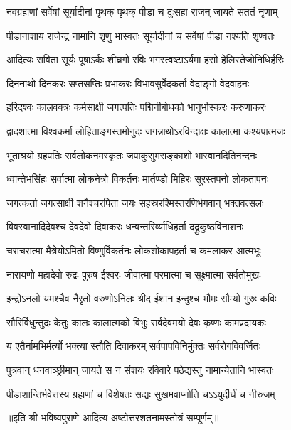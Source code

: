 

\twolineshloka
{नवग्रहाणां सर्वेषां सूर्यादीनां पृथक् पृथक्}
{पीडा च दुःसहा राजन् जायते सततं नृणाम्}

\twolineshloka
{पीडानाशाय राजेन्द्र नामानि शृणु भास्वतः}
{सूर्यादीनां च सर्वेषां पीडा नश्यति शृण्वतः}

\twolineshloka
{आदित्यः सविता सूर्यः पूषाऽर्कः शीघ्रगो रविः}
{भगस्त्वष्टाऽर्यमा हंसो हेलिस्तेजोनिधिर्हरिः}

\twolineshloka
{दिननाथो दिनकरः सप्तसप्तिः प्रभाकरः}
{विभावसुर्वेदकर्ता वेदाङ्गो वेदवाहनः}

\twolineshloka
{हरिदश्वः कालवक्त्रः कर्मसाक्षी जगत्पतिः}
{पद्मिनीबोधको भानुर्भास्करः करुणाकरः}

\twolineshloka
{द्वादशात्मा विश्वकर्मा लोहिताङ्गस्तमोनुदः}
{जगन्नाथोऽरविन्दाक्षः कालात्मा कश्यपात्मजः}

\twolineshloka
{भूताश्रयो ग्रहपतिः सर्वलोकनमस्कृतः}
{जपाकुसुमसङ्काशो भास्वानदितिनन्दनः}

\twolineshloka
{ध्वान्तेभसिंहः सर्वात्मा लोकनेत्रो विकर्तनः}
{मार्तण्डो मिहिरः सूरस्तपनो लोकतापनः}

\twolineshloka
{जगत्कर्ता जगत्साक्षी शनैश्चरपिता जयः}
{सहस्ररश्मिस्तरणिर्भगवान् भक्तवत्सलः}

\twolineshloka
{विवस्वानादिदेवश्च देवदेवो दिवाकरः}
{धन्वन्तरिर्व्याधिहर्ता दद्रुकुष्ठविनाशनः}

\twolineshloka
{चराचरात्मा मैत्रेयोऽमितो विष्णुर्विकर्तनः}
{लोकशोकापहर्ता च कमलाकर आत्मभूः}

\twolineshloka
{नारायणो महादेवो रुद्रः पुरुष ईश्वरः}
{जीवात्मा परमात्मा च सूक्ष्मात्मा सर्वतोमुखः}

\twolineshloka
{इन्द्रोऽनलो यमश्चैव नैरृतो वरुणोऽनिलः}
{श्रीद ईशान इन्दुश्च भौमः सौम्यो गुरुः कविः}

\twolineshloka
{सौरिर्विधुन्तुदः केतुः कालः कालात्मको विभुः}
{सर्वदेवमयो देवः कृष्णः कामप्रदायकः}

\twolineshloka
{य एतैर्नामभिर्मर्त्यो भक्त्या स्तौति दिवाकरम्}
{सर्वपापविनिर्मुक्तः सर्वरोगविवर्जितः}

\twolineshloka
{पुत्रवान् धनवाञ्छ्रीमान् जायते स न संशयः}
{रविवारे पठेद्यस्तु नामान्येतानि भास्वतः}

\twolineshloka
{पीडाशान्तिर्भवेत्तस्य ग्रहाणां च विशेषतः}
{सद्यः सुखमवाप्नोति चऽऽयुर्दीर्घं च नीरुजम्}

॥इति श्री भविष्यपुराणे आदित्य अष्टोत्तरशतनामस्तोत्रं सम्पूर्णम्॥